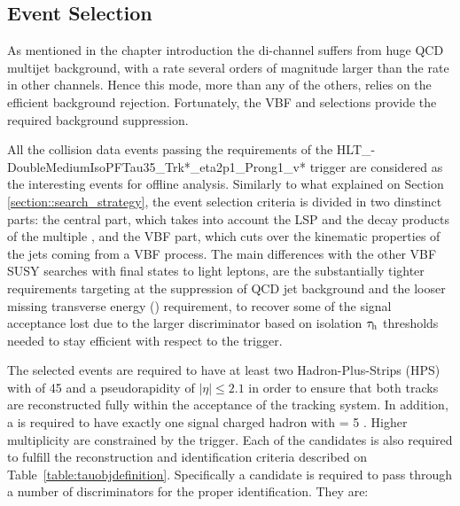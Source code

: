 \subsection{Event Selection}

As mentioned in the chapter introduction the di-\hadtau channel suffers from huge QCD multijet background, with a rate several orders of magnitude larger than the rate in other channels.  Hence this mode, more than any of the others, relies on the efficient background rejection. Fortunately, the VBF and \met selections provide the required background suppression.

All the collision data events passing the requirements of the
HLT\_-DoubleMediumIsoPFTau35\_Trk*\_eta2p1\_Prong1\_v*
trigger are considered as the interesting events 
for offline analysis.
Similarly to what explained on Section \ref{section::search_strategy}, the event selection criteria is divided in two dinstinct parts: the central part, which takes into account the LSP and the decay products of the multiple \hadtau, and the VBF part, which cuts over the kinematic properties of the jets coming from a VBF process.
The main differences with the other VBF SUSY searches with final states to light leptons, are the substantially tighter \hadtau requirements targeting at the suppression of QCD jet background and the looser missing transverse energy (\met) requirement, to recover some of the signal acceptance lost due to the larger discriminator based on isolation
$\tau_{\text{h}}$ \pt thresholds needed to stay efficient with respect to the trigger.  

The selected events are required to have at least two Hadron-Plus-Strips (HPS) \hadtau with \pt of 45 \gev and a pseudorapidity of $|\eta| \le 2.1$ in order to ensure that both tracks are reconstructed fully within the acceptance of the tracking system. In addition, a \hadtau is required to have exactly one signal charged hadron with \pt = 5 \gev. Higher multiplicity \hadtau are constrained by the trigger. Each of the \hadtau candidates is also required to fulfill the reconstruction and identification criteria described on Table~\ref{table:tauobjdefinition}. Specifically a \hadtau candidate is required to pass through a number of discriminators for the proper identification. They are:

